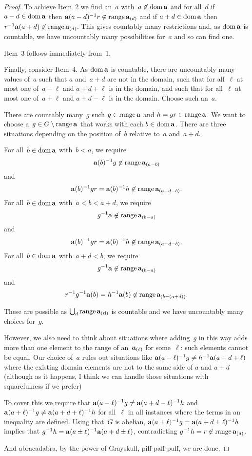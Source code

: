 \documentclass[a4paper,12pt]{article}
\newcommand{\dom}{\mathop{\rm dom}\nolimits}
\newcommand{\range}{\mathop{\rm range}\nolimits}
\begin{document}
\begin{proof}
To achieve Item~2 we find an~$a$ with~$a \not\in \dom{{\bf a}}$ and for all~$d$ if $a-d \in \dom{{\bf a}}$ then ${\bf a}(a-d)^{-1}r \not\in \range{{\bf a}_{(d)}}$ and if  $a+d \in \dom{{\bf a}}$ then $r^{-1}{\bf a}(a+d) \not\in \range{{\bf a}_{(d)}}$.  This gives countably many restrictions and, as $\dom{{\bf a}}$ is countable, we have uncountably many possibilities for~$a$ and so can find one.


Item~3 follows immediately from~1.

Finally, consider Item~4.  As $\dom{{\bf a}}$ is countable, there are uncountably many values of~$a$ such that $a$ and~$a+d$ are not in the domain,  such that for all~$\ell$ at most one of~$a-\ell$ and $a+d + \ell$ is in the domain, and such that for all~$\ell$ at most one of~$a+\ell$ and $a+d - \ell$ is in the domain.   Choose such an~$a$.  

There are countably many~$g$ such $g \in \range{{\bf a}}$ and $h = gr \in  \range{{\bf a}}$.  We want to choose a~$g \in G \setminus \range{{\bf a}}$ that works with each $b \in \dom{{\bf a}}$.  There are three situations depending on the position of~$b$ relative to~$a$ and~$a+d$. 

For all~$b \in \dom{{\bf a}}$ with~$b<a$, we require $${\bf a}(b)^{-1}g \not\in \range{{\bf a}_{(a-b)}}$$ and $$  {\bf a}(b)^{-1}gr =  {\bf a}(b)^{-1}h \not\in \range{{\bf a}_{(a+d-b)}}.$$
For all~$b \in \dom{{\bf a}}$ with~$a<b<a+d$, we require $$g^{-1}{\bf a} \not\in \range{{\bf a}_{(b-a)}}$$ and $$  {\bf a}(b)^{-1}gr =  {\bf a}(b)^{-1}h \not\in \range{{\bf a}_{(a+d-b)}}.$$  
For all~$b \in \dom{{\bf a}}$ with~$a+d < b$, we require $$g^{-1}{\bf a} \not\in \range{{\bf a}_{(b-a)}}$$ and $$r^{-1}g^{-1}  {\bf a}(b) =  h^{-1}{\bf a}(b) \not\in \range{{\bf a}_{(b - (a+d))}}.$$  


These are possible as $\bigcup_{d} \range{{\bf a_{(d)}}}$ is countable and we have uncountably many choices for~$g$.

However, we also need to think about situations where adding~$g$ in this way adds more than one element to the range of an~${\bf a}_{(\ell)}$ for some~$\ell$: such elements cannot be equal. Our choice of~$a$ rules out situations  like ${\bf a}(a-\ell)^{-1}g \neq h^{-1} {\bf a}(a+d+\ell)$ where the existing domain elements are not to the same side of $a$ and $a+d$ (although as it happens, I think we can handle those situations with squarefulness if we prefer)

To cover this we require that ${\bf a}(a-\ell)^{-1}g \neq {\bf a}(a+d-\ell)^{-1}h$ and  ${\bf a}(a+\ell)^{-1}g \neq {\bf a}(a+d+\ell)^{-1}h$ for all~$\ell$ in all instances where the terms in an inequality are defined.
Using that~$G$ is abelian, ${\bf a}(a \pm \ell)^{-1}g = {\bf a}(a+d \pm \ell)^{-1}h$ implies that $g^{-1}h = {\bf a}(a \pm \ell)^{-1}{\bf a}(a+d \pm \ell)$, contradicting $g^{-1}h = r \not\in \range{{\bf a}_{(d)}}$.


And abracadabra, by the power of Grayskull, piff-paff-puff, we are done.
\end{proof}
\end{document}
